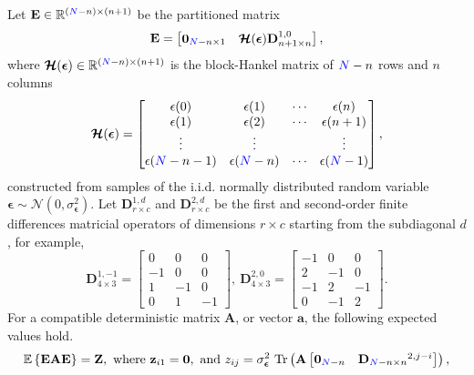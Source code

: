 \begin{lem} \label{lem:lemma1}
Let $\mathbf{E} \in \mathbb{R}^{\left(\color{blue}N\color{black}-n\right) \times \left(n+1\right)}$ be the partitioned matrix 
\[ \mathbf{E} = \begin{bmatrix} \mathbf{0}_{\color{blue}N\color{black}-n \times 1} & \bm{\mathcal{H}}(\bm{\epsilon}) \mathbf{D}_{n+1 \times n}^{1,0} \end{bmatrix}, \]
 where $\bm{\mathcal{H}}(\bm{\epsilon}) \in \mathbb{R}^{\left(\color{blue}N\color{black}-n\right) \times \left(n+1\right)}$ is the block-Hankel matrix of $\color{blue}N\color{black}-n$ rows and $n$ columns
\[ \bm{\mathcal{H}}(\bm{\epsilon}) = \begin{bmatrix} \epsilon(0) & \epsilon(1) & \cdots & \epsilon(n) \\ \epsilon(1) & \epsilon(2) & \cdots & \epsilon(n+1) \\ \vdots & \vdots & & \vdots \\ \epsilon(\color{blue}N\color{black}-n-1) & \epsilon(\color{blue}N\color{black}-n) & \cdots & \epsilon(\color{blue}N\color{black}-1) \end{bmatrix} , \]
constructed from samples of the i.i.d. normally distributed random variable $\bm{\epsilon} \sim \mathcal{N}(0, \sigma_{\bm{\epsilon}}^2)$.
Let $\mathbf{D}_{r \times c}^{1,d}$ and $\mathbf{D}_{r \times c}^{2,d}$ be the first and second-order finite differences matricial operators of dimensions $r \times c$ starting from the subdiagonal $d$, for example, 
\[ \mathbf{D}_{4 \times 3}^{1,-1} = \begin{bmatrix} 0 & 0 & 0 \\ -1 & 0 & 0 \\ 1 & -1 & 0 \\ 0 & 1 & -1 \end{bmatrix}, \ \mathbf{D}_{4 \times 3}^{2,0} = \begin{bmatrix}-1 & 0 & 0 \\ 2 & -1 & 0 \\ - 1 & 2 & -1 \\ 0 & -1 & 2 \end{bmatrix} . \]
For a compatible deterministic matrix $\mathbf{A}$, or vector $\mathbf{a}$, the following expected values hold.
\begin{equation*} \begin{aligned} 
& \mathbb{E} \left\{ \mathbf{E} \mathbf{A} \mathbf{E} \right\} = \mathbf{Z}, \
\text{where} \ \mathbf{z}_{i1} = \mathbf{0}, \ \text{and} \ 
z_{ij} = \sigma_{\bm{\epsilon}}^2 \ \mathrm{Tr} \left( \mathbf{A} \begin{bmatrix} \mathbf{0}_{\color{blue}N\color{black}-n} & \mathbf{D}_{\color{blue}N\color{black}-n \times n}^{2, j-i} \end{bmatrix} \right), \\

\end{aligned}
\end{equation*}
\end{lem}
